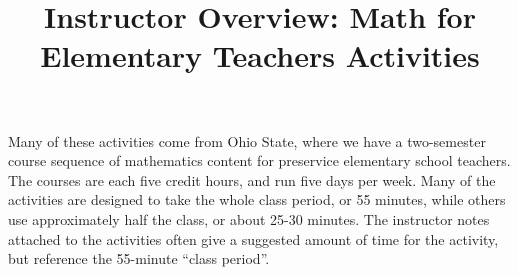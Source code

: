 \documentclass{ximera}
\title{Instructor Overview: Math for Elementary Teachers Activities}
\begin{document}
\begin{abstract}\end{abstract}\maketitle

Many of these activities come from Ohio State, where we have a two-semester course sequence of mathematics
content for preservice elementary school teachers.  The courses are each five credit hours, and run five days per 
week.  Many of the activities are designed to take the whole class period, or 55 minutes, while others use 
approximately half the class, or about 25-30 minutes.  The instructor notes attached to the activities often give a 
suggested amount of time for the activity, but reference the 55-minute ``class period''.
\end{document}

